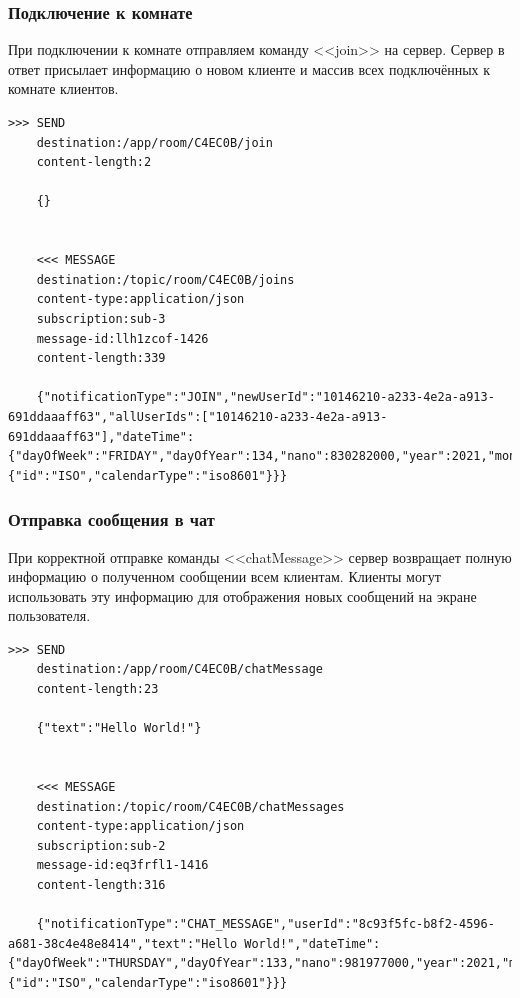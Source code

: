 \documentclass{../includes/TechDocMultiAuthors}
\begin{document}
    \subsubsection{Подключение к комнате}

    При подключении к комнате отправляем команду <<join>> на сервер.
    Сервер в ответ присылает информацию о новом клиенте и массив всех подключённых к комнате клиентов.

    \begin{lstlisting}[language=text,caption={Запрос и ответ при входе в комнату}]
    >>> SEND
    destination:/app/room/C4EC0B/join
    content-length:2

    {}


    <<< MESSAGE
    destination:/topic/room/C4EC0B/joins
    content-type:application/json
    subscription:sub-3
    message-id:llh1zcof-1426
    content-length:339

    {"notificationType":"JOIN","newUserId":"10146210-a233-4e2a-a913-691ddaaaff63","allUserIds":["10146210-a233-4e2a-a913-691ddaaaff63"],"dateTime":{"dayOfWeek":"FRIDAY","dayOfYear":134,"nano":830282000,"year":2021,"monthValue":5,"dayOfMonth":14,"hour":0,"minute":3,"second":58,"month":"MAY","chronology":{"id":"ISO","calendarType":"iso8601"}}}
    \end{lstlisting}

    \subsubsection{Отправка сообщения в чат}

    При корректной отправке команды <<chatMessage>> сервер возвращает полную информацию о полученном сообщении всем клиентам.
    Клиенты могут использовать эту информацию для отображения новых сообщений на экране пользователя.

    \begin{lstlisting}[language=text,caption={Запрос и ответ при отправке сообщения в чат}]
    >>> SEND
    destination:/app/room/C4EC0B/chatMessage
    content-length:23

    {"text":"Hello World!"}


    <<< MESSAGE
    destination:/topic/room/C4EC0B/chatMessages
    content-type:application/json
    subscription:sub-2
    message-id:eq3frfl1-1416
    content-length:316

    {"notificationType":"CHAT_MESSAGE","userId":"8c93f5fc-b8f2-4596-a681-38c4e48e8414","text":"Hello World!","dateTime":{"dayOfWeek":"THURSDAY","dayOfYear":133,"nano":981977000,"year":2021,"monthValue":5,"dayOfMonth":13,"hour":22,"minute":46,"second":55,"month":"MAY","chronology":{"id":"ISO","calendarType":"iso8601"}}}
    \end{lstlisting}
\end{document}
